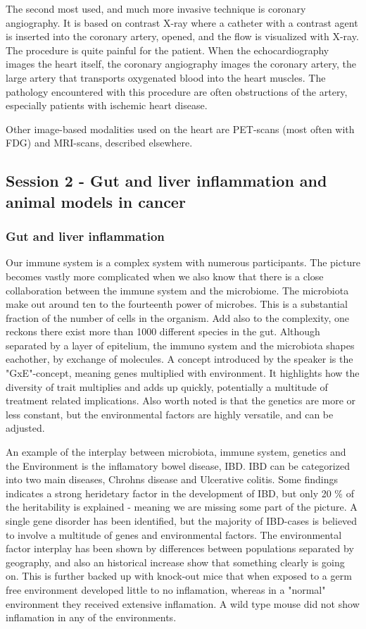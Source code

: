 \documentclass[12p]{article}
\begin{document}
The second most used, and much more invasive technique is coronary angiography.
It is based on contrast X-ray where a catheter with a contrast agent is inserted into the coronary artery, opened, and the flow is visualized with X-ray.
The procedure is quite painful for the patient.
When the echocardiography images the heart itself, the coronary angiography images the coronary artery, the large artery that transports oxygenated blood into the heart muscles.
The pathology encountered with this procedure are often obstructions of the artery, especially patients with ischemic heart disease. 

Other image-based modalities used on the heart are PET-scans (most often with FDG) and MRI-scans, described elsewhere.

\subsection*{Session 2 - Gut and liver inflammation and animal models in cancer}

\subsubsection{Gut and liver inflammation}

Our immune system is a complex system with numerous participants.
The picture becomes vastly more complicated when we also know that there is a close collaboration between the immune system and the microbiome.
The microbiota make out around ten to the fourteenth power of microbes.
This is a substantial fraction of the number of cells in the organism.
Add also to the complexity, one reckons there exist more than 1000 different species in the gut.
Although separated by a layer of epitelium, the immuno system and the microbiota shapes eachother, by exchange of molecules.
A concept introduced by the speaker is the "GxE"-concept, meaning genes multiplied with environment.
It highlights how the diversity of trait multiplies and adds up quickly, potentially a multitude of treatment related implications.
Also worth noted is that the genetics are more or less constant, but the environmental factors are highly versatile, and can be adjusted.

An example of the interplay between microbiota, immune system, genetics and the Environment is the inflamatory bowel disease, IBD.
IBD can be categorized into two main diseases, Chrohns disease and Ulcerative colitis.
Some findings indicates a strong heridetary factor in the development of IBD, but only 20 \% of the heritability is explained - meaning we are missing some part of the picture.
A single gene disorder has been identified, but the majority of IBD-cases is believed to involve a multitude of genes and environmental factors.
The environmental factor interplay has been shown by differences between populations separated by geography, and also an historical increase show that something clearly is going on.
This is further backed up with knock-out mice that when exposed to a germ free environment developed little to no inflamation, whereas in a "normal" environment they received extensive inflamation.
A wild type mouse did not show inflamation in any of the environments.
\end{document}
